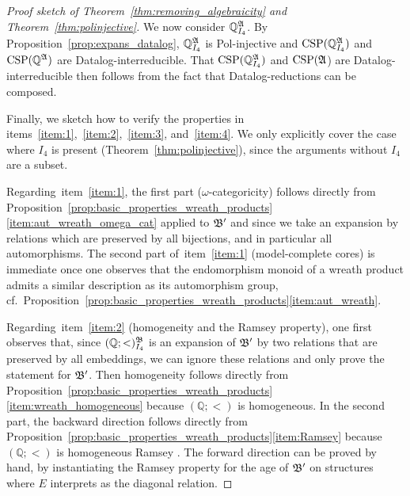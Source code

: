 \begin{proof}[Proof sketch of Theorem~\ref{thm:removing_algebraicity} and Theorem~\ref{thm:polinjective}]
 We now consider $\mathbb{Q}^{\mathfrak{A}}_{I_4}$. 
%
By Proposition~\ref{prop:expans_datalog}, $\mathbb{Q}^{\mathfrak{A}}_{I_4}$ is Pol-injective and $\mathrm{CSP}(\mathbb{Q}^{\mathfrak{A}}_{I_4})$ and $\mathrm{CSP}(\mathbb{Q}^{\mathfrak{A}})$ are Datalog-interreducible.
%
That $\mathrm{CSP}(\mathbb{Q}^{\mathfrak{A}}_{I_4})$ and $\mathrm{CSP}(\mathfrak{A}$) are Datalog-interreducible then follows from the fact that Datalog-reductions can be composed.
 

Finally, we sketch how to verify the properties in items~\ref{item:1},~\ref{item:2},~\ref{item:3}, and~\ref{item:4}.  
%
We only explicitly cover the case where $I_4$ is present (Theorem~\ref{thm:polinjective}), since the arguments without $I_4$ are a subset.

Regarding~item~\ref{item:1}, the first part ($\omega$-categoricity) follows directly from Proposition~\ref{prop:basic_properties_wreath_products}\eqref{item:aut_wreath_omega_cat} applied to $\mathfrak{B}'$ and since we take an expansion by relations which are preserved by all bijections, and in particular all automorphisms. 
% 
The second part of~item~\ref{item:1}  (model-complete cores) is immediate %
 once one observes that the endomorphism monoid of a wreath product admits a similar description
as its automorphism group, cf.~Proposition~\ref{prop:basic_properties_wreath_products}\eqref{item:aut_wreath}.

Regarding~item~\ref{item:2} (homogeneity and the Ramsey property), one first observes that, since $(\mathbb{Q};<)^{\mathfrak{B}}_{I_4}$ is an expansion of $\mathfrak{B}'$ by two relations that are preserved by all embeddings, we can ignore these relations and only prove the statement for $\mathfrak{B}'$.
%
Then homogeneity follows directly from Proposition~\ref{prop:basic_properties_wreath_products}\eqref{item:wreath_homogeneous} because $(\mathbb{Q};<)$ is homogeneous.
%
In the second part, the backward direction follows directly from Proposition~\ref{prop:basic_properties_wreath_products}\eqref{item:Ramsey} because $(\mathbb{Q};<)$ is homogeneous Ramsey \cite{kechris2005fraisse}.
%
The forward direction can be proved by hand, by instantiating the Ramsey property for the age of $\mathfrak{B}'$ on structures where $E$ interprets as the diagonal relation.  



\end{proof}
